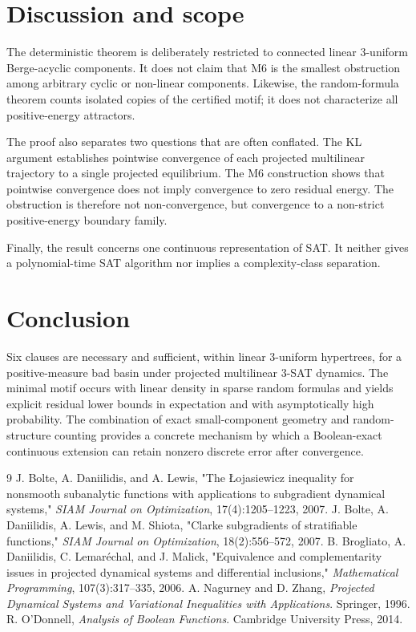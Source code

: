 \documentclass[11pt,a4paper]{article}
\begin{document}
\section{Discussion and scope}
The deterministic theorem is deliberately restricted to connected linear 3-uniform Berge-acyclic components. It does not claim that M6 is the smallest obstruction among arbitrary cyclic or non-linear components. Likewise, the random-formula theorem counts isolated copies of the certified motif; it does not characterize all positive-energy attractors.

The proof also separates two questions that are often conflated. The KL argument establishes pointwise convergence of each projected multilinear trajectory to a single projected equilibrium. The M6 construction shows that pointwise convergence does not imply convergence to zero residual energy. The obstruction is therefore not non-convergence, but convergence to a non-strict positive-energy boundary family.

Finally, the result concerns one continuous representation of SAT. It neither gives a polynomial-time SAT algorithm nor implies a complexity-class separation.
\section{Conclusion}
Six clauses are necessary and sufficient, within linear 3-uniform hypertrees, for a positive-measure bad basin under projected multilinear 3-SAT dynamics. The minimal motif occurs with linear density in sparse random formulas and yields explicit residual lower bounds in expectation and with asymptotically high probability. The combination of exact small-component geometry and random-structure counting provides a concrete mechanism by which a Boolean-exact continuous extension can retain nonzero discrete error after convergence.
\begin{thebibliography}{9}
 J. Bolte, A. Daniilidis, and A. Lewis, "The \L{}ojasiewicz inequality for nonsmooth subanalytic functions with applications to subgradient dynamical systems," \emph{SIAM Journal on Optimization}, 17(4):1205--1223, 2007.
 J. Bolte, A. Daniilidis, A. Lewis, and M. Shiota, "Clarke subgradients of stratifiable functions," \emph{SIAM Journal on Optimization}, 18(2):556--572, 2007.
 B. Brogliato, A. Daniilidis, C. Lemar\'echal, and J. Malick, "Equivalence and complementarity issues in projected dynamical systems and differential inclusions," \emph{Mathematical Programming}, 107(3):317--335, 2006.
 A. Nagurney and D. Zhang, \emph{Projected Dynamical Systems and Variational Inequalities with Applications}. Springer, 1996.
 R. O'Donnell, \emph{Analysis of Boolean Functions}. Cambridge University Press, 2014.
\end{thebibliography}
\end{document}
